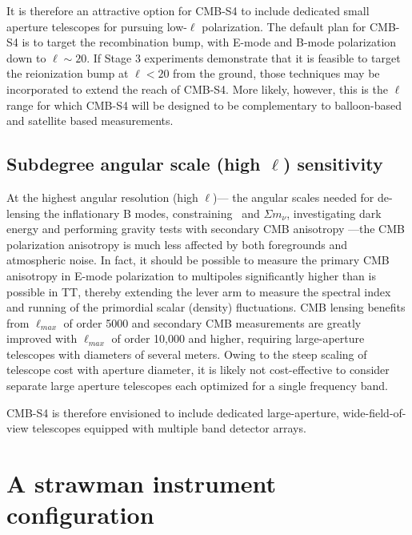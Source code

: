 It is therefore an attractive option for CMB-S4 to include dedicated small aperture telescopes for pursuing low-$\ell$ polarization. The default plan for CMB-S4 is to target the recombination bump, with E-mode and B-mode polarization down to $\ell \sim 20$. If Stage 3 experiments demonstrate that it is feasible to target the reionization bump at $\ell < 20$ from the ground, those techniques may be incorporated to extend the reach of CMB-S4. More likely, however, this is the $\ell$ range for which CMB-S4 will be designed to be complementary to balloon-based and satellite based measurements. 

\subsection{Subdegree angular scale (high $\ell$) sensitivity}

At the highest angular resolution (high $\ell$)--- the angular scales needed for de-lensing the inflationary B modes, constraining \neff\ and $\Sigma m_\nu$,  investigating dark energy and performing gravity tests with secondary CMB  anisotropy ---the CMB polarization anisotropy is much less affected by both foregrounds and atmospheric noise. In fact, it should be possible to measure the primary CMB anisotropy in E-mode polarization to multipoles significantly higher than is possible in TT, thereby extending the lever arm to measure the spectral index and running of the primordial scalar (density) fluctuations. CMB lensing benefits from $\ell_{max}$ of order 5000 and secondary CMB measurements are greatly improved with $\ell_{max}$ of order 10,000 and higher, requiring large-aperture telescopes with diameters of several meters. Owing to the steep scaling of telescope cost with aperture diameter, it is likely not cost-effective to consider separate large aperture telescopes each optimized for a single frequency band. 

CMB-S4 is therefore envisioned to include dedicated large-aperture, wide-field-of-view telescopes equipped with multiple band detector arrays.

\section{A strawman instrument configuration}
\label{sec:strawman}

